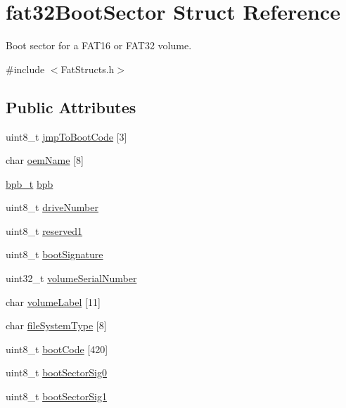 \hypertarget{structfat32_boot_sector}{}\section{fat32\+Boot\+Sector Struct Reference}
\label{structfat32_boot_sector}


Boot sector for a F\+A\+T16 or F\+A\+T32 volume.  




{\ttfamily \#include $<$Fat\+Structs.\+h$>$}

\subsection*{Public Attributes}
\begin{DoxyCompactItemize}
\item 
uint8\+\_\+t \hyperlink{structfat32_boot_sector_ad8c4921d1fcaba0370cff44a27f6f2d1}{jmp\+To\+Boot\+Code} \mbox{[}3\mbox{]}
\item 
char \hyperlink{structfat32_boot_sector_a8516a46b7865715cf0f8f5c39dd96273}{oem\+Name} \mbox{[}8\mbox{]}
\item 
\hyperlink{_fat_structs_8h_a5c8af240713e05e7e6c959006ced35fb}{bpb\+\_\+t} \hyperlink{structfat32_boot_sector_a01848fd44bea48d521bf13dcc8d69c95}{bpb}
\item 
uint8\+\_\+t \hyperlink{structfat32_boot_sector_a625a50384e3a46c5e330d0398c35a898}{drive\+Number}
\item 
uint8\+\_\+t \hyperlink{structfat32_boot_sector_a0a59c59a3f18c1117ffc6a0c25295b9c}{reserved1}
\item 
uint8\+\_\+t \hyperlink{structfat32_boot_sector_a1a06079dbeb74e505689a56ab08c05a7}{boot\+Signature}
\item 
uint32\+\_\+t \hyperlink{structfat32_boot_sector_aa4dffa8748097e02373c33d5f1957b1e}{volume\+Serial\+Number}
\item 
char \hyperlink{structfat32_boot_sector_a327d3769a6a9d172cec163cda30a35ee}{volume\+Label} \mbox{[}11\mbox{]}
\item 
char \hyperlink{structfat32_boot_sector_a2835c957e6b680afded2b5f7e133fd3e}{file\+System\+Type} \mbox{[}8\mbox{]}
\item 
uint8\+\_\+t \hyperlink{structfat32_boot_sector_a7a845a41d575937bb7aac2c5204a6e1d}{boot\+Code} \mbox{[}420\mbox{]}
\item 
uint8\+\_\+t \hyperlink{structfat32_boot_sector_aea26006be62f6bbca4637e359ce85e40}{boot\+Sector\+Sig0}
\item 
uint8\+\_\+t \hyperlink{structfat32_boot_sector_a92816cfa0d97e94c46eaff1ccc92f1fa}{boot\+Sector\+Sig1}
\end{DoxyCompactItemize}


